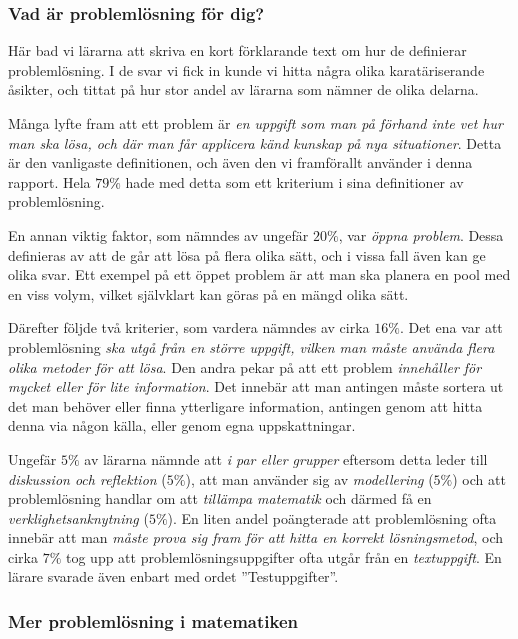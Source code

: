 \subsubsection{Vad är problemlösning för dig?}
\textcolor{lila}{Här bad vi lärarna att skriva en kort förklarande text om hur de definierar problemlösning. I de svar vi fick in kunde vi hitta några olika karatäriserande åsikter, och tittat på hur stor andel av lärarna som nämner de olika delarna.}

\textcolor{lila}{Många lyfte fram att ett problem är \textsl{en uppgift som man på förhand inte vet hur man ska lösa, och där man får applicera känd kunskap på nya situationer}. Detta är den vanligaste definitionen, och även den vi framförallt använder i denna rapport. Hela $79\%$ hade med detta som ett kriterium i sina definitioner av problemlösning.}

\textcolor{lila}{En annan viktig faktor, som nämndes av ungefär $20\%$, var \textsl{öppna problem}. Dessa definieras av att de går att lösa på flera olika sätt, och i vissa fall även kan ge olika svar. Ett exempel på ett öppet problem är att man ska planera en pool med en viss volym, vilket självklart kan göras på en mängd olika sätt.}

\textcolor{lila}{Därefter följde två kriterier, som vardera nämndes av cirka $16\%$. Det ena var att problemlösning \textsl{ska utgå från en större uppgift, vilken man måste använda flera olika metoder för att lösa}. Den andra pekar på att ett problem \textsl{innehåller för mycket eller för lite information}. Det innebär att man antingen måste sortera ut det man behöver eller finna ytterligare information, antingen genom att hitta denna via någon källa, eller genom egna uppskattningar.}

\textcolor{lila}{Ungefär $5\%$ av lärarna nämnde att \textsl{i par eller grupper} eftersom detta leder till \textsl{diskussion och reflektion} ($5\%$), att man använder sig av \textsl{modellering} ($5\%$) och att problemlösning handlar om att \textsl{tillämpa matematik} och därmed få en \textsl{verklighetsanknytning} ($5\%$). En liten andel poängterade att problemlösning ofta innebär att man \textsl{måste prova sig fram för att hitta en korrekt lösningsmetod}, och cirka $7\%$ tog upp att problemlösningsuppgifter ofta utgår från en \textsl{textuppgift}. En lärare svarade även enbart med ordet ''Testuppgifter''.}

\subsubsection{Mer problemlösning i matematiken}
\label{sec:MerProblemlosning}


